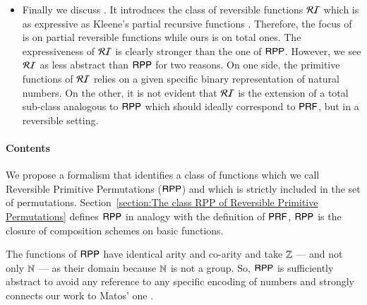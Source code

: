 \begin{itemize}
\item 
Finally we discuss \cite{jacopini89tcs}. 
It introduces the class of reversible functions $ \mathcal{RI} $ which is as expressive as Kleene's
partial recursive functions \cite{cutland1980book,odifreddi1989book}. 
Therefore, the focus of \cite{jacopini89tcs} is on partial reversible functions while ours  is on total ones. 
The expressiveness of $ \mathcal{RI} $ is clearly stronger than the one of  $ \mathsf{RPP} $. 
However, we see $ \mathcal{RI} $ as less abstract than $ \mathsf{RPP} $ for two reasons.
On one side, the primitive functions of $ \mathcal{RI} $ relies on a given specific binary representation of natural numbers.
On the other, it is not evident that $ \mathcal{RI} $ is the extension of a total sub-class
analogous to $ \mathsf{RPP} $ which should ideally correspond to $ \mathsf{P}\mathsf{RF} $, but in a reversible setting.
\end{itemize}

\paragraph{Contents}
We propose a formalism that identifies a class of functions which we call Reversible Primitive Permutations
($ \mathsf{RPP} $) and which is strictly included in the set of permutations.
Section~\ref{section:The class RPP of Reversible Primitive Permutations} defines $ \mathsf{RPP} $ in analogy
with the definition of $ \mathsf{P}\mathsf{RF} $, \ie $ \mathsf{RPP} $ is the closure of composition schemes on basic functions.

The functions of $ \mathsf{RPP} $ have identical arity and co-arity and take 
$ \mathbb{Z} $ --- and not only $ \mathbb{N} $ --- as their 
domain because $ \mathbb{N} $ is not a group. So, $ \mathsf{RPP} $ is sufficiently abstract 
to avoid any reference to any specific 
encoding of numbers and strongly connects our work to Matos' one \cite{matos03tcs}.

